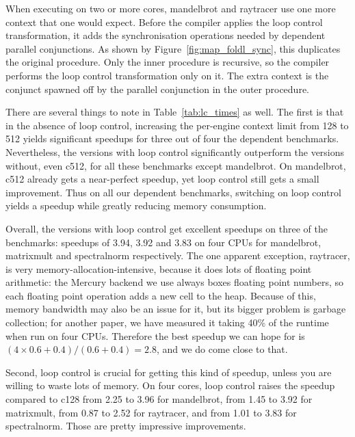 When executing on two or more cores,
mandelbrot and raytracer use one more context that one would expect.
Before the compiler applies the loop control transformation,
it adds the synchronisation operations
needed by dependent parallel conjunctions.
As shown by Figure~\ref{fig:map_foldl_sync},
this duplicates the original procedure.
Only the inner procedure is recursive,
so the compiler performs the loop control transformation only on it.
The extra context is
the conjunct spawned off by the parallel conjunction in the outer procedure.

There are several things to note in Table~\ref{tab:lc_times} as well.
The first is that in the absence of loop control,
increasing the per-engine context limit from 128 to 512
yields significant speedups for three out of four the dependent benchmarks.
Nevertheless, the versions with loop control
significantly outperform the versions without, even c512,
for all these benchmarks except mandelbrot.
On mandelbrot, c512 already gets a near-perfect speedup,
yet loop control still gets a small improvement.
Thus on all our dependent benchmarks,
switching on loop control yields a speedup
while greatly reducing memory consumption.

Overall, the versions with loop control
get excellent speedups on three of the benchmarks:
speedups of 3.94, 3.92 and 3.83 on four CPUs
for mandelbrot, matrixmult and spectralnorm respectively.
The one apparent exception, raytracer,
is very memory-allocation-intensive,
because it does lots of floating point arithmetic:
the Mercury backend we use always boxes floating point numbers,
so each floating point operation adds a new cell to the heap.
Because of this, memory bandwidth may also be an issue for it,
but its bigger problem is garbage collection;
for another paper,
we have measured it taking 40\% of the runtime when run on four CPUs.
Therefore the best speedup we can hope for is
$(4 \times 0.6 + 0.4)/(0.6 + 0.4) = 2.8$,
and we do come close to that.

Second,
loop control is crucial for getting this kind of speedup,
unless you are willing to waste lots of memory.
On four cores, loop control raises the speedup compared to c128
from 2.25 to 3.96 for mandelbrot,
from 1.45 to 3.92 for matrixmult,
from 0.87 to 2.52 for raytracer,
and from 1.01 to 3.83 for spectralnorm.
Those are pretty impressive improvements.

